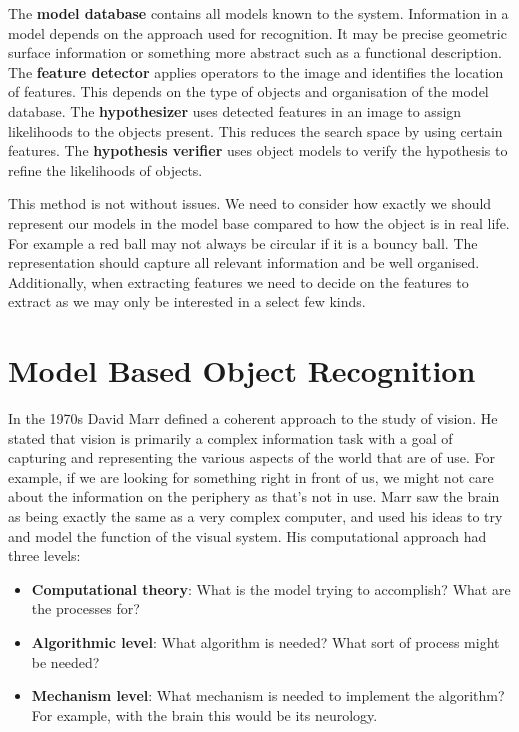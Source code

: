\documentclass{article}
\begin{document}
	The \textbf{model database} contains all models known to the system. Information in a model depends on the approach used for recognition. It may be precise geometric surface information or something more abstract such as a functional description. The \textbf{feature detector} applies operators to the image and identifies the location of features. This depends on the type of objects and organisation of the model database. The \textbf{hypothesizer} uses detected features in an image to assign likelihoods to the objects present. This reduces the search space by using certain features. The \textbf{hypothesis verifier} uses object models to verify the hypothesis to refine the likelihoods of objects.
	
	\par 
	This method is not without issues. We need to consider how exactly we should represent our models in the model base compared to how the object is in real life. For example a red ball may not always be circular if it is a bouncy ball. The representation should capture all relevant information and be well organised. Additionally, when extracting features we need to decide on the features to extract as we may only be interested in a select few kinds.
	
	\section{Model Based Object Recognition}
	In the 1970s David Marr defined a coherent approach to the study of vision. He stated that vision is primarily a complex information task with a goal of capturing and representing the various aspects of the world that are of use. For example, if we are looking for something right in front of us, we might not care about the information on the periphery as that's not in use. Marr saw the brain as being exactly the same as a very complex computer, and used his ideas to try and model the function of the visual system. His computational approach had three levels:
	\begin{itemize}
		\item \textbf{Computational theory}: What is the model trying to accomplish? What are the processes for?
		\item \textbf{Algorithmic level}: What algorithm is needed? What sort of process might be needed?
		\item \textbf{Mechanism level}: What mechanism is needed to implement the algorithm? For example, with the brain this would be its neurology.
	\end{itemize}
	
\end{document}
